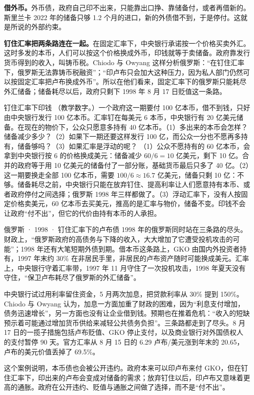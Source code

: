 \textbf{借外币。}外币债，政府自己印不出来，只能靠出口挣、靠储备付，或者再借新的。斯里兰卡 2022 年的储备只够 1.2 个月的进口，新的外债借不到，于是停付。这就是所说的外部约束。

\textbf{钉住汇率把两条路连在一起。}在固定汇率下，中央银行承诺按一个价格买卖外汇。这时多发的本币，人们可以按这个价格换成外币，印钱就等于卖储备。政府靠发行货币得到的收入，叫铸币税。Chiodo 与 Owyang 这样分析俄罗斯：“在钉住汇率下，俄罗斯无法靠铸币税融资”；“印卢布只会加大这种压力，因为私人部门仍然可以按固定汇率把卢布换成外币”\cite{chiodo2002}。所以在他们看来，固定汇率下的俄罗斯只能耗尽外汇储备；储备耗尽以后，政府只剩下 1998 年 8 月 17 日贬值这一条路\cite{chiodo2002}。

\begin{example}{钉住汇率下印钱}\label{ex:intro-peg}
（教学数字。）一个政府这一期要付 100 亿本币，借不到钱，只好由中央银行发行 100 亿本币。汇率钉在每美元 6 本币，中央银行有 20 亿美元储备。在现在的物价下，公众只愿意多持有 40 亿本币。（1）多出来的本币会怎样？储备减少多少？（2）如果下一期还要这样发行 100 亿，而公众一分也不愿再多持有，储备够吗？（3）如果汇率是浮动的呢？
\solution （1）公众不愿持有的 60 亿本币，会拿到中央银行按 6 的价格换成美元：储备减少 $60/6=10$ 亿美元，剩下 10 亿。合并的政府等于用 10 亿美元的储备付了一部分账，基础货币最后只多了 40 亿。（2）这一期要换走全部 100 亿本币，需要 $100/6\approx16.7$ 亿美元，储备只剩 10 亿：不够。储备耗尽之前，中央银行只能在放弃钉住、提高利率让人们愿意持有本币、或者政府停付之间选择；俄罗斯 1998 年三样都做了。（3）浮动汇率下，没有人按固定价格卖美元，60 亿本币去买美元，推高的是汇率与物价，储备不变。印钱不会让政府“付不出”，但它的代价由持有本币的人承担。
\end{example}

\begin{case}{俄罗斯 · 1998 · 钉住汇率下的卢布债}
1998 年的俄罗斯同时站在三条路的尽头。财政上，“俄罗斯政府的高债务与下降的收入，大大增加了它遭受投机攻击的可能”；1998 年还有大笔短期外债到期\cite{chiodo2002}。借本币这条路上，GKO 由国内外投资者持有，1997 年末约 30\% 在非居民手里，非居民的卢布资产随时可能换成美元。汇率上，中央银行守着汇率带，1997 年 11 月守住了一次投机攻击，1998 年夏天没有守住，“保卫卢布耗尽了俄罗斯的外汇储备”\cite{chiodo2002}。

中央银行试过用利率留住资金，5 月两次加息，把贷款利率从 30\% 提到 150\%。Chiodo 与 Owyang 认为，加息一方面加重了财政的困难，因为“利息支付增加，债务迅速增长”，另一方面也没有让企业借到钱\cite{chiodo2002}。预期也在推着危机：“收入的短缺预示着可能通过增加货币供给来减轻公共债务负担”\cite{chiodo2002}。三条路都走到了尽头。8 月 17 日的一揽子措施包括卢布贬值、GKO 停止支付，以及商业银行对外国债权人的支付暂停 90 天\cite{chiodo2002}。官方汇率从 8 月 15 日的 6.29 卢布/美元涨到年末的 20.65\cite{cbr2026}，卢布的美元价值丢掉了 69.5\%。

这个案例说明，本币债也会被公开违约。政府本来可以印卢布来付 GKO，但在钉住汇率下，印出来的卢布会变成对储备的需求；放弃钉住以后，印卢布又意味着更高的通胀。政府在公开违约、贬值与通胀之间做了选择，而不是“付不出”。
\end{case}

